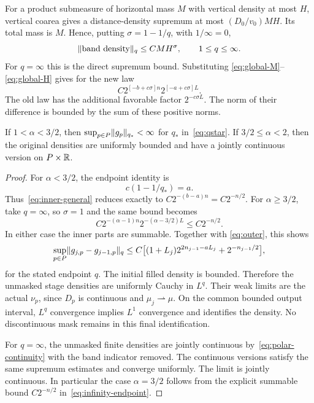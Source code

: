 For a product submeasure of horizontal mass $M$ with vertical density
at most $H$, vertical coarea gives a distance-density supremum at most
$(D_0/v_0)MH$. Its total mass is $M$. Hence, putting
$\sigma=1-1/q$, with $1/\infty=0$,
\begin{equation}\label{eq:MH}
 \lVert \text{band density}\rVert_q\leq C M H^\sigma,
 \qquad 1\leq q\leq\infty.
\end{equation}
For $q=\infty$ this is the direct supremum bound. Substituting
\eqref{eq:global-M}--\eqref{eq:global-H} gives for the new law
\begin{equation}\label{eq:inner-general}
 C2^{[-b+c\sigma]n}2^{[-a+c\sigma]L}.
\end{equation}
The old law has the additional favorable factor $2^{-c\sigma L}$.
The norm of their difference is bounded by the sum of these positive norms.

\begin{proposition}\label{prop:super-upper}
If $1<\alpha<3/2$, then
$\sup_{p\in P}\lVert g_p\rVert_{q_*}<\infty$ for $q_*$ in~\eqref{eq:qstar}.
If $3/2\leq\alpha<2$, then the original densities are uniformly bounded
and have a jointly continuous version on $P\times\mathbb R$.
\end{proposition}
\begin{proof}
For $\alpha<3/2$, the endpoint identity is
\[
 c(1-1/q_*)=a.
\]
Thus~\eqref{eq:inner-general} reduces exactly to
$C2^{-(b-a)n}=C2^{-n/2}$. For $\alpha\geq3/2$, take $q=\infty$,
so $\sigma=1$ and the same bound becomes
\begin{equation}\label{eq:infinity-endpoint}
 C2^{-(\alpha-1)n}2^{-(\alpha-3/2)L}\leq C2^{-n/2}.
\end{equation}
In either case the inner parts are summable. Together with
\eqref{eq:outer}, this shows
\begin{equation}\label{eq:super-increment}
 \sup_{p\in P}\lVert g_{j,p}-g_{j-1,p}\rVert_q
 \leq C\bigl[(1+L_j)2^{2n_{j-1}-aL_j}+2^{-n_{j-1}/2}\bigr],
\end{equation}
for the stated endpoint $q$. The initial filled density is bounded.
Therefore the unmasked stage densities are uniformly Cauchy in $L^q$.
Their weak limits are the actual $\nu_p$, since $D_p$ is continuous
and $\mu_j\rightharpoonup\mu$. On the common bounded output interval,
$L^q$ convergence implies $L^1$ convergence and identifies the density.
No discontinuous mask remains in this final identification.

For $q=\infty$, the unmasked finite densities are jointly continuous
by~\eqref{eq:polar-continuity} with the band indicator removed.
The continuous versions satisfy the same supremum estimates and converge
uniformly. The limit is jointly continuous. In particular the case
$\alpha=3/2$ follows from the explicit summable bound $C2^{-n/2}$
in~\eqref{eq:infinity-endpoint}.
\end{proof}

